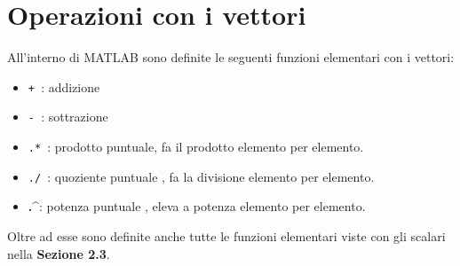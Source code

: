 \section{Operazioni con i vettori}
All'interno di MATLAB sono definite le seguenti funzioni elementari con i vettori:
\begin{itemize}

	\item	\texttt{+ }: addizione
	\item	\texttt{- }: sottrazione
	\item	\texttt{.* }: prodotto puntuale, fa il prodotto elemento per elemento.
	\item	\texttt{./ }: quoziente puntuale , fa la divisione elemento per elemento.
	\item	\textbf{.\^}: potenza puntuale , eleva a potenza elemento per elemento.

\end{itemize}

Oltre ad esse sono definite anche tutte le funzioni elementari viste con gli scalari nella \textbf{Sezione 2.3}.
